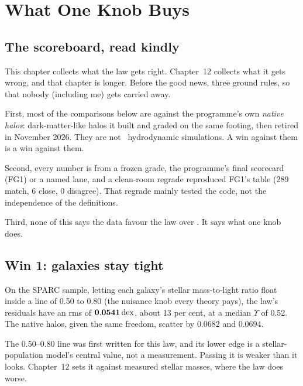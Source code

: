\chapter{What One Knob Buys}




\section{The scoreboard, read kindly}

This chapter collects what the law gets right. Chapter~12 collects what it gets wrong, and that chapter is longer. Before the good news, three ground rules, so that nobody (including me) gets carried away.

First, most of the comparisons below are against the programme's own \emph{native halos}: dark-matter-like halos it built and graded on the same footing, then retired in November 2026. They are not \LCDM\ hydrodynamic simulations. A win against them is a win against them.

Second, every number is from a frozen grade, the programme's final scorecard (FG1) or a named lane, and a clean-room regrade reproduced FG1's table (289 match, 6 close, 0 disagree). That regrade mainly tested the code, not the independence of the definitions.

Third, none of this says the data favour the law over \LCDM. It says what one knob does.

\section{Win 1: galaxies stay tight}

On the SPARC sample, letting each galaxy's stellar mass-to-light ratio float inside a line of 0.50 to 0.80 (the nuisance knob every theory pays), the law's residuals have an rms of $\mathbf{0.0541\,\mathrm{dex}}$, about 13 per cent, at a median $\Upsilon$ of 0.52. The native halos, given the same freedom, scatter by $0.0682$ and $0.0694$.

\begin{honestbox}
The 0.50--0.80 line was first written for this law, and its lower edge is a stellar-population model's central value, not a measurement. Passing it is weaker than it looks. Chapter~12 sets it against measured stellar masses, where the law does worse.
\end{honestbox}

